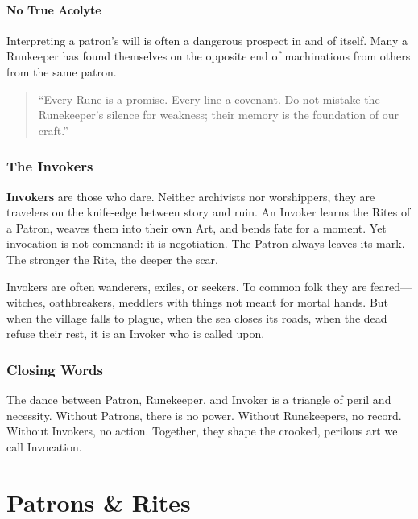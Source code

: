 \paragraph{No True Acolyte}
Interpreting a patron's will is often a dangerous prospect in and of itself. Many a Runkeeper has found themselves on the opposite end of machinations from others from the same patron.

\begin{quote}
``Every Rune is a promise. Every line a covenant. Do not mistake the Runekeeper’s silence for weakness; their memory is the foundation of our craft.''
\end{quote}

\subsubsection{The Invokers}

\textbf{Invokers} are those who dare. Neither archivists nor worshippers, they are travelers on the knife-edge between story and ruin. An Invoker learns the Rites of a Patron, weaves them into their own Art, and bends fate for a moment. Yet invocation is not command: it is negotiation. The Patron always leaves its mark. The stronger the Rite, the deeper the scar.

Invokers are often wanderers, exiles, or seekers. To common folk they are feared---witches, oathbreakers, meddlers with things not meant for mortal hands. But when the village falls to plague, when the sea closes its roads, when the dead refuse their rest, it is an Invoker who is called upon.

\subsubsection{Closing Words}
The dance between Patron, Runekeeper, and Invoker is a triangle of peril and necessity. Without Patrons, there is no power. Without Runekeepers, no record. Without Invokers, no action. Together, they shape the crooked, perilous art we call Invocation.

\section{Patrons \& Rites}
\label{sec:patrons-rites}


\newcommand{\PatronGift}[2]{%
\paragraph{Patron's Gift (Imbuement).}
Once per scene as an action (cost: 1 Boon; requires \textbf{Thiasos}), touch an item to imbue it until scene end with \textbf{+1 Melee} and \textbf{+1 #1}. \emph{Push It:} extend one more scene by marking \textbf{+1 Obligation}. Gifts from the same Patron don’t stack; take the best. Dice bonuses respect the +3 cap. \textit{Domain:} #2.
}

